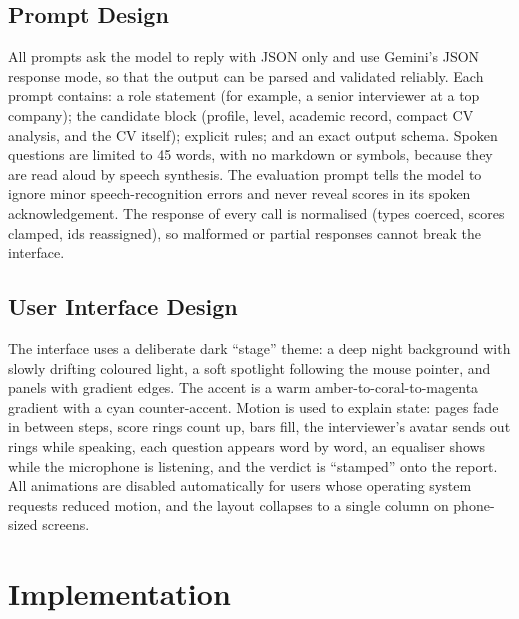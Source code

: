 \documentclass[12pt,a4paper,oneside]{report}
\begin{document}
\section{Prompt Design}
All prompts ask the model to reply with JSON only and use Gemini's JSON response mode, so that the output can be parsed and validated reliably. Each prompt contains: a role statement (for example, a senior interviewer at a top company); the candidate block (profile, level, academic record, compact CV analysis, and the CV itself); explicit rules; and an exact output schema. Spoken questions are limited to 45 words, with no markdown or symbols, because they are read aloud by speech synthesis. The evaluation prompt tells the model to ignore minor speech-recognition errors and never reveal scores in its spoken acknowledgement. The response of every call is normalised (types coerced, scores clamped, ids reassigned), so malformed or partial responses cannot break the interface.

\section{User Interface Design}
The interface uses a deliberate dark ``stage'' theme: a deep night background with slowly drifting coloured light, a soft spotlight following the mouse pointer, and panels with gradient edges. The accent is a warm amber-to-coral-to-magenta gradient with a cyan counter-accent. Motion is used to explain state: pages fade in between steps, score rings count up, bars fill, the interviewer's avatar sends out rings while speaking, each question appears word by word, an equaliser shows while the microphone is listening, and the verdict is ``stamped'' onto the report. All animations are disabled automatically for users whose operating system requests reduced motion, and the layout collapses to a single column on phone-sized screens.

\chapter{Implementation}\label{ch:impl}
\end{document}
